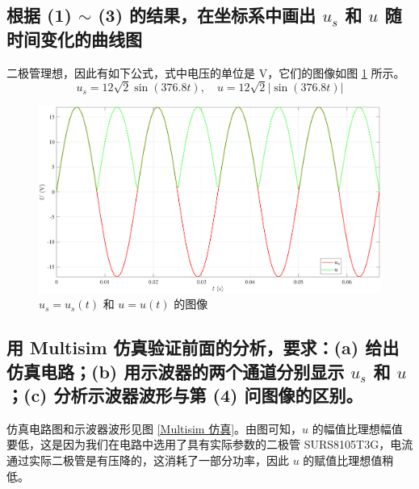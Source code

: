 \documentclass[UTF8]{report}
\theoremstyle{MyLineTheoremStyle} %
\theoremstyle{MyBlockTheoremStyle} %
\theoremstyle{MySubsubsectionStyle} %
\begin{document}
\subsection{根据 (1) $\sim$ (3) 的结果，在坐标系中画出 $u_s$ 和 $u$ 随时间变化的曲线图}
二极管理想，因此有如下公式，式中电压的单位是 V，它们的图像如图 \ref{理想图像} 所示。
\begin{equation}
u_s = 12 \sqrt{2} \sin (376.8 t),\quad u = 12 \sqrt{2}  \left| \sin (376.8 t) \right| 
\end{equation}
\begin{figure}[H]\centering
\includegraphics[width=0.75\columnwidth]{assets/7/2024-10-17_00-07-30.pdf}
\caption{$u_s = u_s(t)$ 和 $u = u(t)$ 的图像}\label{理想图像}
\end{figure}

\subsection{用 Multisim 仿真验证前面的分析，要求：(a) 给出仿真电路；(b) 用示波器的两个通道分别显示 $u_s$ 和 $u$；(c) 分析示波器波形与第 (4) 问图像的区别。}

仿真电路图和示波器波形见图 \ref{Multisim 仿真}。由图可知，$u$ 的幅值比理想幅值要低，这是因为我们在电路中选用了具有实际参数的二极管 SURS8105T3G，电流通过实际二极管是有压降的，这消耗了一部分功率，因此 $u$ 的赋值比理想值稍低。
\end{document}
